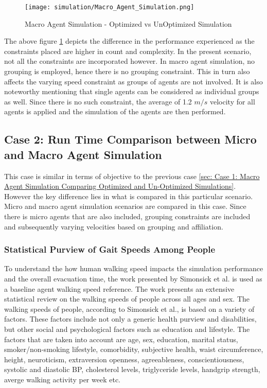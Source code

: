 \begin{figure}[H]
  \centering
  \texttt{[image: simulation/Macro\_Agent\_Simulation.png]}
  \caption{Macro Agent Simulation - Optimized vs UnOptimized Simulation}
  \label{Macro Agent Simulation}
\end{figure}

The above figure \ref{Macro Agent Simulation} depicts the difference in the performance experienced as the constraints placed are higher in count and complexity. In the present scenario, not all the constraints are incorporated however. In macro agent simulation, no grouping is employed, hence there is no grouping constraint. This in turn also affects the varying speed constraint as groups of agents are not involved. It is also noteworthy mentioning that single agents can be considered as individual groups as well. Since there is no such constraint, the average of 1.2 $m/s$ velocity for all agents is applied and the simulation of the agents are then performed.


\subsection{Case 2: Run Time Comparison between Micro and Macro Agent Simulation}
\label{sec: Case 2: Run Time Comparison between Micro and Macro Agent Simulation}

This case is similar in terms of objective to the previous case \ref{sec: Case 1: Macro Agent Simulation Comparing Optimized and Un-Optimized Simulations}. However the key difference lies in what is compared in this particular scenario. Micro and macro agent simulation scenarios are compared in this case. Since there is micro agents that are also included, grouping constraints are included and subsequently varying velocities based on grouping and affiliation.

\subsubsection{Statistical Purview of Gait Speeds Among People}
\label{sec: Statistical Purview of Gait Speeds Among People}
To understand the how human walking speed impacts the simulation performance and the overall evacuation time, the work presented by Simonsick et al. \cite{ref29} is used as a baseline agent walking speed reference. The work presents an extensive statistical review on the walking speeds of people across all ages and sex. The walking speeds of people, according to Simonsick et al., is based on a variety of factors. These factors include not only a generic health purview and disabilities, but other social and psychological factors such as education and lifestyle. The factors that are taken into account are age, sex, education, marital status, smoker/non-smoking lifestyle, comorbidity, subjective health, waist circumference, height, neuroticism, extraversion openness, agreeableness, conscientiousness, systolic and diastolic BP, cholesterol levels, triglyceride levels, handgrip strength, averge walking activity per week etc. 

